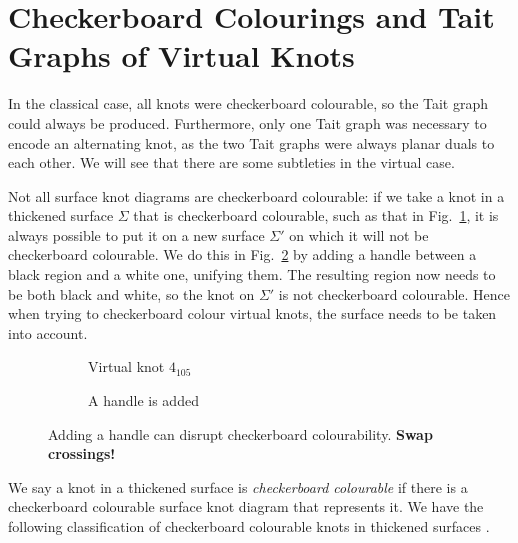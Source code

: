 \documentclass[12pt]{report}
\newcommand{\notered}[1]{{\color{Red} \textbf{#1}}}
\begin{document}
\section{Checkerboard Colourings and Tait Graphs of Virtual Knots}

In the classical case, all knots were checkerboard colourable, so the Tait graph could always be produced. Furthermore, only one Tait graph was necessary to encode an alternating knot, as the two Tait graphs were always planar duals to each other. We will see that there are some subtleties in the virtual case.

Not all surface knot diagrams are checkerboard colourable: if we take a knot in a thickened surface $\Sigma$ that is checkerboard colourable, such as that in Fig.~\ref{fig:4-105-vknot}, it is always possible to put it on a new surface $\Sigma'$ on which it will not be checkerboard colourable. We do this in Fig.~\ref{fig:4-105-vknot-with-handle} by adding a handle between a black region and a white one, unifying them. The resulting region now needs to be both black and white, so the knot on $\Sigma'$ is not checkerboard colourable. Hence when trying to checkerboard colour virtual knots, the surface needs to be taken into account.

\begin{figure}[hbt]
	\centering
	\hspace*{\fill}
	\begin{subfigure}[b]{0.4 \textwidth}
		\centering
		\def\svgscale{0.35}
		
		\caption{Virtual knot $4_{105}$}
		\label{fig:4-105-vknot}
	\end{subfigure}
	\hspace*{\fill}	\hspace*{\fill}	\hspace*{\fill}
	\begin{subfigure}[b]{0.4 \textwidth}
		\centering
		\def\svgscale{0.35}
		
		\caption{A handle is added}
		\label{fig:4-105-vknot-with-handle}
	\end{subfigure}
	\hspace*{\fill} 
	\caption{Adding a handle can disrupt checkerboard colourability. \notered{Swap crossings!}}
	\label{fig:adding-handle-to-4-105}
\end{figure}

We say a knot in a thickened surface is \textit{checkerboard colourable} if there is a checkerboard colourable surface knot diagram that represents it. We have the following classification of checkerboard colourable knots in thickened surfaces \cite{minimal-diagrams-surface-links}.
\end{document}
